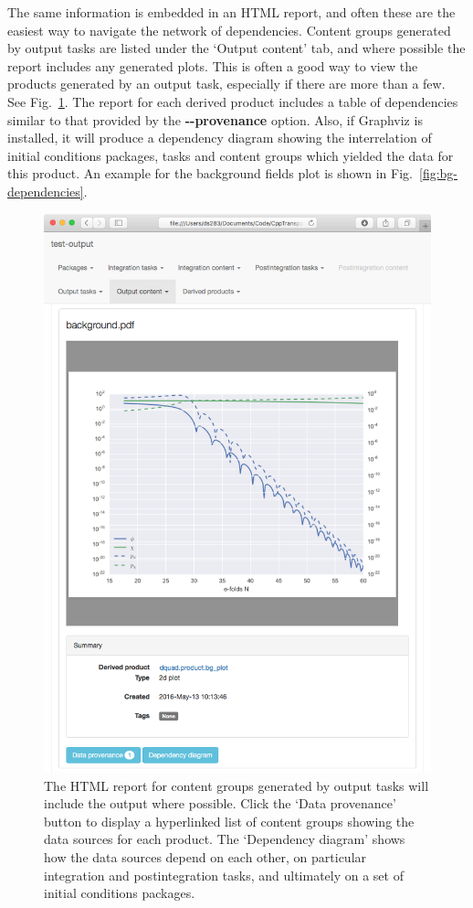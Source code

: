 \documentclass[11pt,a4paper]{article}
\newcommand{\packagefont}{\sffamily}
\newcommand{\Graphviz}{{\packagefont Graphviz}}
\newcommand{\option}[1]{{\ttfamily\bfseries\small #1}}
\begin{document}
The same information is embedded in an HTML report,
and often these are the easiest way to navigate the network of
dependencies.
Content groups generated by output tasks are listed
under the `Output content' tab, and where possible the report
includes any generated plots.
This is often a good way to view the products generated by an output
task, especially if there are more than a few.
See Fig.~\ref{fig:bg-plot-screenshot}.
The report for each derived product includes a table of
dependencies similar to that provided by the
\option{{-}{-}provenance} option.
Also, if {\Graphviz} is installed, it will produce a dependency diagram
showing the interrelation of
initial conditions packages,
tasks and content groups which
yielded the data for this product.
An example for the background fields plot is shown in Fig.~\ref{fig:bg-dependencies}.
\begin{figure}
	\begin{center}
		\includegraphics[scale=0.4]{Screenshots/bg-plot}
	\end{center}
	\caption{\label{fig:bg-plot-screenshot}The HTML report for content groups
	generated by output tasks will include the output where possible.
	Click the `Data provenance' button to display a hyperlinked list of content
	groups showing the data sources for each product.
	The `Dependency diagram' shows how the data sources depend on each other,
	on particular integration and postintegration tasks, and ultimately
	on a set of initial conditions packages.}
\end{figure}
\end{document}

